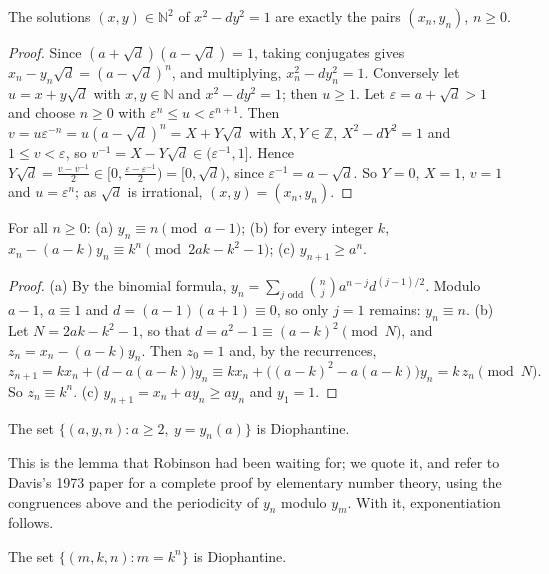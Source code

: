 \begin{lemma}\label{lem:pellsol}
The solutions $(x,y)\in\mathbb N^2$ of $x^2-dy^2=1$ are exactly the pairs $(x_n,y_n)$, $n\ge0$.
\end{lemma}

\begin{proof}
Since $(a+\sqrt d)(a-\sqrt d)=1$, taking conjugates gives $x_n-y_n\sqrt d=(a-\sqrt d)^n$, and multiplying, $x_n^2-dy_n^2=1$. Conversely let $u=x+y\sqrt d$ with $x,y\in\mathbb N$ and $x^2-dy^2=1$; then $u\ge1$. Let $\varepsilon=a+\sqrt d>1$ and choose $n\ge0$ with $\varepsilon^n\le u<\varepsilon^{n+1}$. Then $v=u\varepsilon^{-n}=u(a-\sqrt d)^n=X+Y\sqrt d$ with $X,Y\in\mathbb Z$, $X^2-dY^2=1$ and $1\le v<\varepsilon$, so $v^{-1}=X-Y\sqrt d\in(\varepsilon^{-1},1]$. Hence $Y\sqrt d=\frac{v-v^{-1}}2\in\bigl[0,\frac{\varepsilon-\varepsilon^{-1}}2\bigr)=[0,\sqrt d)$, since $\varepsilon^{-1}=a-\sqrt d$. So $Y=0$, $X=1$, $v=1$ and $u=\varepsilon^n$; as $\sqrt d$ is irrational, $(x,y)=(x_n,y_n)$.
\end{proof}

\begin{lemma}\label{lem:pellcong}
For all $n\ge0$: \textup{(a)} $y_n\equiv n\pmod{a-1}$; \textup{(b)} for every integer $k$, $x_n-(a-k)y_n\equiv k^n\pmod{2ak-k^2-1}$; \textup{(c)} $y_{n+1}\ge a^n$.
\end{lemma}

\begin{proof}
(a) By the binomial formula, $y_n=\sum_{j\text{ odd}}\binom nja^{n-j}d^{(j-1)/2}$. Modulo $a-1$, $a\equiv1$ and $d=(a-1)(a+1)\equiv0$, so only $j=1$ remains: $y_n\equiv n$. (b) Let $N=2ak-k^2-1$, so that $d=a^2-1\equiv(a-k)^2\pmod N$, and $z_n=x_n-(a-k)y_n$. Then $z_0=1$ and, by the recurrences,
\[
z_{n+1}=kx_n+\bigl(d-a(a-k)\bigr)y_n\equiv kx_n+\bigl((a-k)^2-a(a-k)\bigr)y_n=k\,z_n\pmod N.
\]
So $z_n\equiv k^n$. (c) $y_{n+1}=x_n+ay_n\ge ay_n$ and $y_1=1$.
\end{proof}

\begin{theorem}[Matiyasevich, 1970]\label{thm:matiyasevich}
The set $\{(a,y,n):a\ge2,\ y=y_n(a)\}$ is Diophantine.
\end{theorem}

This is the lemma that Robinson had been waiting for; we quote it, and refer to Davis's 1973 paper for a complete proof by elementary number theory, using the congruences above and the periodicity of $y_n$ modulo $y_m$. With it, exponentiation follows.

\begin{proposition}[Robinson]\label{prop:exponential}
The set $\{(m,k,n):m=k^n\}$ is Diophantine.
\end{proposition}

